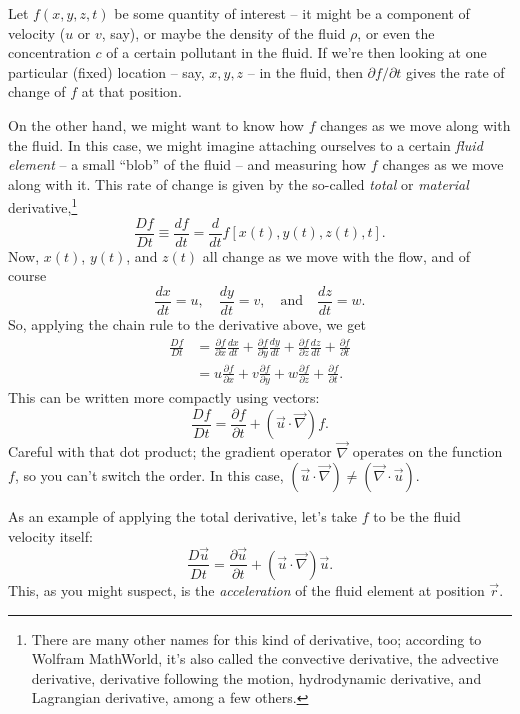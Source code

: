 Let $f(x, y, z, t)$ be some quantity of interest -- it might be a component of velocity ($u$ or $v$, say), or maybe the density of the fluid $\rho$, or even the concentration $c$ of a certain pollutant in the fluid.  If we're then looking at one particular (fixed) location -- say, $x, y, z$ -- in the fluid, then $\partial f / \partial t$ gives the rate of change of $f$ at that position.

On the other hand, we might want to know how $f$ changes as we move along with the fluid.  In this case, we might imagine attaching ourselves to a certain \emph{fluid element} -- a small ``blob'' of the fluid -- and measuring how $f$ changes as we move along with it.  This rate of change is given by the so-called \emph{total} or \emph{material} derivative,\footnote{There are many other names for this kind of derivative, too; according to Wolfram MathWorld, it's also called the convective derivative, the advective derivative, derivative following the motion, hydrodynamic derivative, and Lagrangian derivative, among a few others.}
\[
\frac{Df}{Dt} \equiv \frac{df}{dt} = \frac{d}{dt} f[x(t), y(t), z(t), t].
\]
Now, $x(t)$, $y(t)$, and $z(t)$ all change as we move with the flow, and of course
\[
\frac{dx}{dt} = u, \quad \frac{dy}{dt} = v, \quad \text{and} \quad \frac{dz}{dt} = w.
\]
So, applying the chain rule to the derivative above, we get
\begin{align*}
\frac{Df}{Dt} & =  \frac{\partial f}{\partial x}\frac{dx}{dt} + \frac{\partial f}{\partial y}\frac{dy}{dt} + \frac{\partial f}{\partial z}\frac{dz}{dt} + \frac{\partial f}{\partial t} \\
& = u \frac{\partial f}{\partial x} + v \frac{\partial f}{\partial y} + w \frac{\partial f}{\partial z} + \frac{\partial f}{\partial t}.
\end{align*}
This can be written more compactly using vectors:
\begin{equation}
\label{eq_total_deriv}
\boxed{
\frac{Df}{Dt} = \frac{\partial f}{\partial t} + (\vec{u} \cdot \vec{\nabla}) f.
}
\end{equation}
Careful with that dot product; the gradient operator $\vec{\nabla}$ operates on the function $f$, so you can't switch the order.  In this case, $(	\vec{u} \cdot \vec{\nabla}) \neq (\vec{\nabla} \cdot \vec{u})$.

As an example of applying the total derivative, let's take $f$ to be the fluid velocity itself:
\begin{equation}
\label{eq_accel}
\boxed{
\frac{D \vec{u}}{Dt} = \frac{\partial \vec{u}}{\partial t} + (\vec{u} \cdot \vec{\nabla}) \vec{u}.
}
\end{equation}
This, as you might suspect, is the \emph{acceleration} of the fluid element at position $\vec{r}$.


